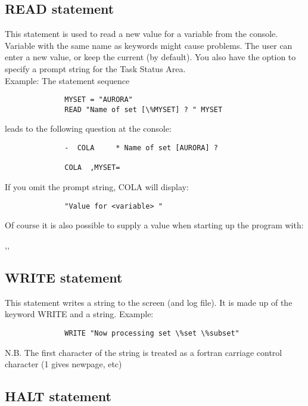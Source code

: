 \subsection*{READ statement}

This statement is used to read a new value for a variable
from the console. Variable with the same name as keywords might cause 
problems. The user can enter a new value, or keep the
current (by default).  You also have the option to specify a
prompt string for the Task Status Area.\\

Example: The statement sequence
\begin{verbatim}
              MYSET = "AURORA"
              READ "Name of set [\%MYSET] ? " MYSET
\end{verbatim}
leads to the following question at the console:
\begin{verbatim}
              -  COLA     * Name of set [AURORA] ?

              COLA  ,MYSET=
\end{verbatim}
              
If you omit the prompt string, COLA will display:
\begin{verbatim}
              "Value for <variable> "
\end{verbatim}
Of course it is also possible to supply a value when starting up the 
program with:
\begin{center}
        ,,
\end{center}

\subsection*{WRITE statement}

This statement writes a string to the screen (and log file).
It is made up of the keyword WRITE and a string.
Example:
\begin{verbatim}
              WRITE "Now processing set \%set \%subset"
\end{verbatim}

N.B.  The first character of the string is treated as a
fortran carriage control character (1 gives newpage, etc)

\subsection*{HALT statement}


